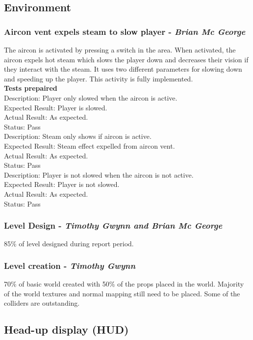 \documentclass[a4paper,10pt]{article}
\begin{document}
\subsection{Environment}
\subsubsection{Aircon vent expels steam to slow player - \textit{Brian Mc George}}
The aircon is activated by pressing a switch in the area. When activated, the aircon expels hot steam which slows the player down and decreases their vision if they interact with the steam. It uses two different parameters for slowing down and speeding up the player. This activity is fully implemented.
\smallskip\\\textbf{Tests prepaired}\\
Description: Player only slowed when the aircon is active.\\
Expected Result: Player is slowed.\\
Actual Result: As expected.\\
Status: Pass
\smallskip\\
Description: Steam only shows if aircon is active.\\
Expected Result: Steam effect expelled from aircon vent.\\
Actual Result: As expected.\\
Status: Pass
\smallskip\\
Description: Player is not slowed when the aircon is not active.\\
Expected Result: Player is not slowed.\\
Actual Result: As expected.\\
Status: Pass

\subsubsection{Level Design - \textit{Timothy Gwynn and Brian Mc George}}
85\% of level designed during report period. 

\subsubsection{Level creation - \textit{Timothy Gwynn}}
70\% of basic world created with 50\% of the props placed in the world. Majority of the world textures and normal mapping still need to be placed. Some of the colliders are outstanding.

\subsection{Head-up display (HUD)}
\end{document}
